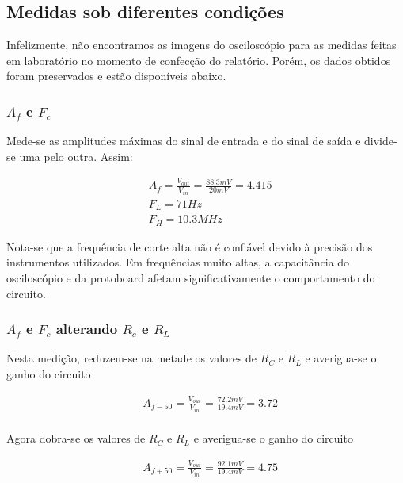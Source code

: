 \subsection{Medidas sob diferentes condições}

Infelizmente, não encontramos as imagens do osciloscópio para as medidas feitas em laboratório no momento de confecção do relatório. Porém, os dados obtidos foram preservados e estão disponíveis abaixo.

\subsubsection{$A_f$ e $F_c$}

Mede-se as amplitudes máximas do sinal de entrada e do sinal de saída e divide-se uma pelo outra. Assim:

\begin{equation}
    \begin{aligned}
         & A_f = \frac{V_{out}}{V_{in}} = \frac{88.3mV}{20mV} = 4.415 \\
         & F_L = 71 Hz                                                \\
         & F_H = 10.3 MHz
    \end{aligned}
\end{equation}

Nota-se que a frequência de corte alta não é confiável devido à precisão dos instrumentos utilizados. Em frequências muito altas, a capacitância do osciloscópio e da protoboard afetam significativamente o comportamento do circuito.

\subsubsection{$A_f$ e $F_c$ alterando $R_c$ e $R_L$}

Nesta medição, reduzem-se na metade os valores de $R_C$ e $R_L$ e averigua-se o ganho do circuito

\begin{equation}
    \begin{aligned}
         & A_{f-50} = \frac{V_{out}}{V_{in}} = \frac{72.2mV}{19.4mV} = 3.72 \\
    \end{aligned}
\end{equation}

Agora dobra-se os valores de $R_C$ e $R_L$ e averigua-se o ganho do circuito

\begin{equation}
    \begin{aligned}
         & A_{f+50} = \frac{V_{out}}{V_{in}} = \frac{92.1mV}{19.4mV} = 4.75 \\
    \end{aligned}
\end{equation}

